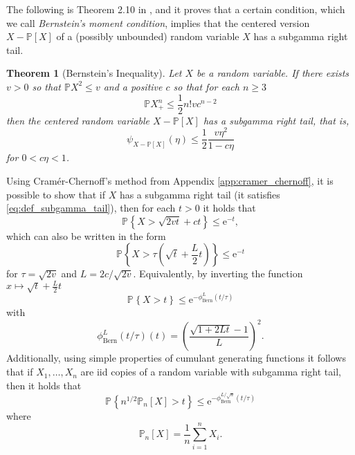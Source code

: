 \documentclass{uvamath}
\newcommand*{\bbP}{\mathbb{P}}
\newcommand*{\prob}[2][]{\mathbb{P}_{#1}\left\{#2\right\}}
\newcommand*{\paren}[1]{\left(#1\right)}
\newcommand*{\rme}{\mathrm{e}}
\newtheorem{theorem}{Theorem}[section]
\theoremstyle{remark}
\theoremstyle{definition}
\theoremstyle{definition}
\theoremstyle{definition}
\theoremstyle{definition}
\theoremstyle{definition}
\begin{document}
\begin{appendices}
The following is Theorem 2.10 in \cite{boucheron_concentration_2013},
and it proves that a certain condition, which we call
\textit{Bernstein's moment condition}, implies that the centered
version $X-\bbP[X]$ of a (possibly unbounded) random variable $X$ has
a subgamma right tail.

\begin{theorem} [Bernstein's Inequality] \label{thm:bernstein_inequality}
  Let $X$ be a random variable. If there exists $v>0$ so that
  $\bbP X^2\leq v$ and a positive $c$ so that for each $n \geq 3$
  \begin{equation}%
    \bbP X_{+}^n\leq\frac{1}{2}n! vc^{n-2}
  \end{equation}
  then the centered random variable $X-\bbP[X]$ has a subgamma right
  tail, that is,
  \begin{equation}%
    \psi_{X-\bbP[X]}(\eta)\leq \frac{1}{2}\frac{v\eta^2}{1-c\eta}
  \end{equation} for $0<c\eta< 1$.
\end{theorem}

Using Cramér-Chernoff's method from Appendix
\ref{app:cramer_chernoff}, it is possible to show that if $X$ has a
subgamma right tail (it satisfies \eqref{eq:def_subgamma_tail}), then
for each $t>0$ it holds that
\begin{equation*}
  \prob{X>\sqrt{2vt} + ct}\leq \rme^{-t},
\end{equation*}
which can also be written in the form
\begin{equation*}
  \prob{X > \tau\paren{\sqrt{t} + \frac{L}{2}t }}\leq \rme^{-t}
\end{equation*}
for $\tau = \sqrt{2v}$ and $L = 2c/\sqrt{2v}$. Equivalently, by
inverting the function $x\mapsto \sqrt{t} + \frac{L}{2}t$
\begin{equation*}
  \prob{X > t}\leq \rme^{-\phi_{\text{Bern}}^L(t/\tau)}
\end{equation*}
with
\begin{equation*}
  \phi_{\mathrm{Bern}}^L(t/\tau)(t)
  = \paren{\frac{\sqrt{1 + 2Lt} - 1}{L}}^2.
\end{equation*}
Additionally, using simple properties of cumulant generating functions
it follows that if $X_1,\dots,X_n$ are iid copies of a random variable
with subgamma right tail, then it holds that
\begin{equation*}
  \prob{n^{1/2}\bbP_n[X] > t}\leq \rme^{-\phi_{\text{Bern}}^{L/\sqrt{n}}(t/\tau)}
\end{equation*}
where
\begin{equation*}
  \bbP_n[X] = \frac{1}{n}\sum_{i=1}^nX_i.
\end{equation*}



\end{appendices}
\end{document}
